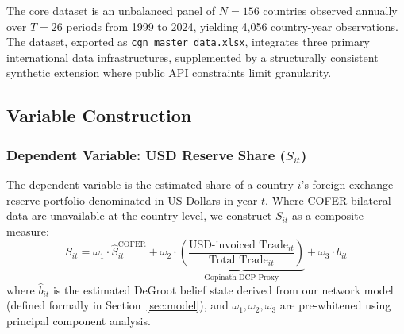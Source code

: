 \documentclass[12pt, letterpaper]{article}
\theoremstyle{definition}
\begin{document}
The core dataset is an unbalanced panel of $N = 156$ countries observed annually over $T = 26$ periods from 1999 to 2024, yielding 4,056 country-year observations. The dataset, exported as \texttt{cgn\_master\_data.xlsx}, integrates three primary international data infrastructures, supplemented by a structurally consistent synthetic extension where public API constraints limit granularity.

\begin{tcolorbox}[colback=cgnlight, colframe=cgnblue, title=\textbf{Datasource Registry}, fonttitle=\bfseries, left=4pt, right=4pt]
\end{tcolorbox}

\subsection{Variable Construction}

\subsubsection{Dependent Variable: USD Reserve Share \texorpdfstring{($S_{it}$)}{(S\_it)}}

The dependent variable is the estimated share of a country $i$'s foreign exchange reserve portfolio denominated in US Dollars in year $t$. Where COFER bilateral data are unavailable at the country level, we construct $S_{it}$ as a composite measure:
\[
S_{it} = \omega_{1} \cdot \hat{S}^{\text{COFER}}_{it} + \omega_{2} \cdot \underbrace{\left(\frac{\text{USD-invoiced Trade}_{it}}{\text{Total Trade}_{it}}\right)}_{\text{Gopinath DCP Proxy}} + \omega_{3} \cdot \hat{b}_{it}
\]
where $\hat{b}_{it}$ is the estimated DeGroot belief state derived from our network model (defined formally in Section~\ref{sec:model}), and $\omega_{1}, \omega_{2}, \omega_{3}$ are pre-whitened using principal component analysis.
\end{document}
